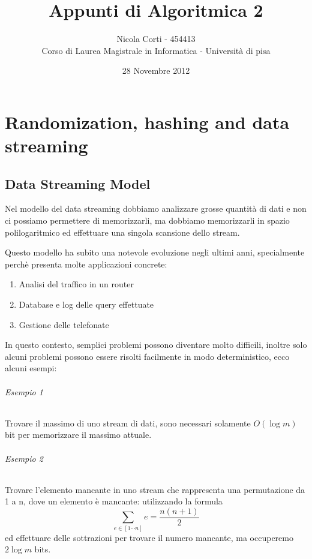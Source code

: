 \documentclass[a4paper,11pt]{book}
\title{Appunti di Algoritmica 2}
\author{Nicola Corti - 454413 \\Corso di Laurea Magistrale in Informatica - Universit\`a di pisa}
\date{28 Novembre 2012}
\begin{document}
\setlength{\parskip}{0.10in}

\maketitle

\tableofcontents

\part{Randomization, hashing and data streaming}

\chapter{Data Streaming Model}

Nel modello del data streaming dobbiamo analizzare grosse quantit\`a di dati e non ci possiamo permettere di memorizzarli, ma dobbiamo memorizzarli in spazio polilogaritmico ed effettuare una singola scansione dello stream.

Questo modello ha subito una notevole evoluzione negli ultimi anni, specialmente perch\`e presenta molte applicazioni concrete:
\begin{enumerate}
\item Analisi del traffico in un router
\item Database e log delle query effettuate
\item Gestione delle telefonate
\end{enumerate}

In questo contesto, semplici problemi possono diventare molto difficili, inoltre solo alcuni problemi possono essere risolti facilmente in modo deterministico, ecco alcuni esempi:

\paragraph{Esempio 1} Trovare il massimo di uno stream di dati, sono necessari solamente $O(\log m)$ bit per memorizzare il massimo attuale.

\paragraph{Esempio 2} Trovare l'elemento mancante in uno stream che rappresenta una permutazione da 1 a n, dove un elemento \`e mancante: utilizzando la formula $$\sum_{e \in [1 \cdots n]} e = \frac{n(n+1)}{2}$$ ed effettuare delle sottrazioni per trovare il numero mancante, ma occuperemo $2 \log  m$ bits.
\end{document}
